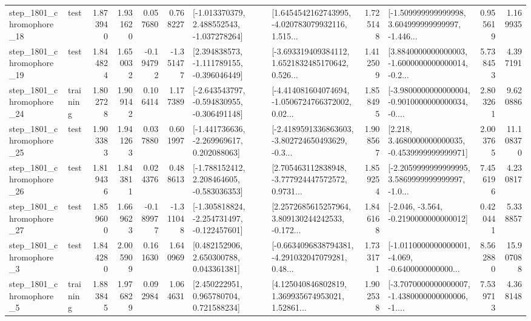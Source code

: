 \begin{tabular}{llrrrrllrlrr}
 step\_1801\_chromophore\_18 &      test &      1.873940 &    1.931620 &      0.057680 &  0.768227 &   [-1.013370379, 2.488552543, -1.037278264] &  [1.6454542162743995, -4.020783079932116, 1.515... &       1.725148 &  [-1.509999999999998, 3.604999999999997, -1.446... &            0.955619 &          1.169935 \\
 step\_1801\_chromophore\_19 &      test &      1.844824 &    1.650032 &     -0.194792 & -1.351477 &   [2.394838573, -1.111789155, -0.396046449] &  [-3.693319409384112, 1.6521832485170642, 0.526... &       1.412509 &  [3.8840000000000003, -1.6000000000000014, -0.2... &            5.738453 &          4.397191 \\
 step\_1801\_chromophore\_24 &  training &      1.802728 &    1.909142 &      0.106414 &  1.177389 &  [-2.643543797, -0.594830955, -0.306491148] &  [-4.414081604074694, -1.0506724766372002, 0.02... &       1.858495 &  [-3.9800000000000004, -0.9010000000000034, -0.... &            2.803261 &          9.620886 \\
 step\_1801\_chromophore\_25 &      test &      1.903383 &    1.941263 &      0.037880 &  0.601997 &   [-1.441736636, -2.269969617, 0.202088063] &  [-2.4189591336863603, -3.802724650493629, -0.3... &       1.908567 &   [2.218, 3.4680000000000035, -0.4539999999999971] &            2.003765 &         11.108370 \\
 step\_1801\_chromophore\_26 &      test &      1.819436 &    1.843811 &      0.024376 &  0.488613 &   [-1.788152412, 2.208464605, -0.583036353] &  [2.705463112838948, -3.777924447572572, 0.9731... &       1.859254 &  [-2.2059999999999995, 3.5869999999999997, -1.0... &            7.456196 &          4.230817 \\
 step\_1801\_chromophore\_27 &      test &      1.859600 &    1.669623 &     -0.189977 & -1.311048 &  [-1.305818824, -2.254731497, -0.122457601] &  [2.2572685615257964, 3.809130244242533, -0.172... &       1.846168 &              [-2.046, -3.564, -0.2190000000000012] &            0.420441 &          5.338857 \\
  step\_1801\_chromophore\_3 &      test &      1.844280 &    2.005909 &      0.161630 &  1.640969 &     [0.482152906, 2.650300788, 0.043361381] &  [-0.6634096838794381, -4.291032047079281, 0.48... &       1.733171 &  [-1.0110000000000001, -4.069, -0.6400000000000... &            8.562880 &         15.907088 \\
  step\_1801\_chromophore\_5 &  training &      1.883845 &    1.976829 &      0.092984 &  1.064631 &     [2.450222951, 0.965780704, 0.721588234] &  [4.125040846802819, 1.369935674953021, 1.52861... &       1.902538 &  [-3.7070000000000007, -1.4380000000000006, -1.... &            7.539713 &          4.368148 \\

\end{tabular}
